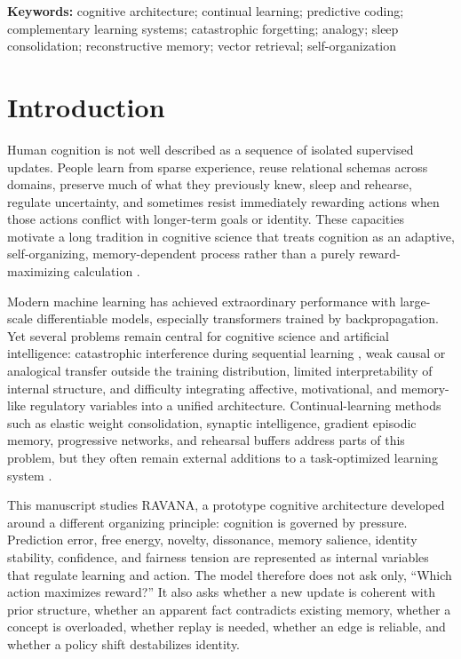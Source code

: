 \documentclass[11pt]{article}
\begin{document}
\textbf{Keywords:} cognitive architecture; continual learning; predictive coding; complementary learning systems; catastrophic forgetting; analogy; sleep consolidation; reconstructive memory; vector retrieval; self-organization

\section{Introduction}
Human cognition is not well described as a sequence of isolated supervised updates. People learn from sparse experience, reuse relational schemas across domains, preserve much of what they previously knew, sleep and rehearse, regulate uncertainty, and sometimes resist immediately rewarding actions when those actions conflict with longer-term goals or identity. These capacities motivate a long tradition in cognitive science that treats cognition as an adaptive, self-organizing, memory-dependent process rather than a purely reward-maximizing calculation \cite{hebb1949,grossberg1980,mcclelland1995,friston2010,kumaran2016}.

Modern machine learning has achieved extraordinary performance with large-scale differentiable models, especially transformers trained by backpropagation. Yet several problems remain central for cognitive science and artificial intelligence: catastrophic interference during sequential learning \cite{mccloskey1989,french1999}, weak causal or analogical transfer outside the training distribution, limited interpretability of internal structure, and difficulty integrating affective, motivational, and memory-like regulatory variables into a unified architecture. Continual-learning methods such as elastic weight consolidation, synaptic intelligence, gradient episodic memory, progressive networks, and rehearsal buffers address parts of this problem, but they often remain external additions to a task-optimized learning system \cite{kirkpatrick2017,zenke2017,lopezpaz2017,rusu2016,rebuffi2017}.

This manuscript studies RAVANA, a prototype cognitive architecture developed around a different organizing principle: cognition is governed by pressure. Prediction error, free energy, novelty, dissonance, memory salience, identity stability, confidence, and fairness tension are represented as internal variables that regulate learning and action. The model therefore does not ask only, ``Which action maximizes reward?'' It also asks whether a new update is coherent with prior structure, whether an apparent fact contradicts existing memory, whether a concept is overloaded, whether replay is needed, whether an edge is reliable, and whether a policy shift destabilizes identity.
\end{document}
